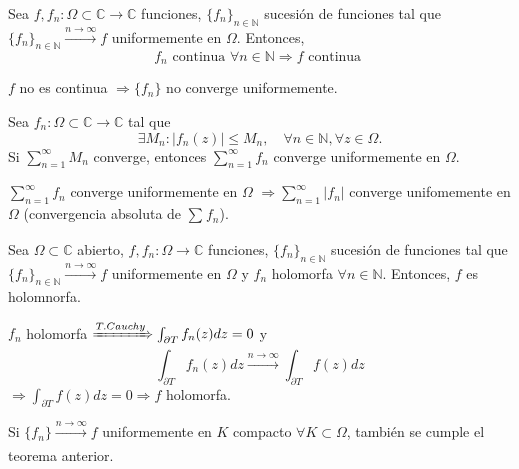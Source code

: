 \begin{prop}
  Sea $f,f_{n}: \Omega \subset \mathbb{C} \to \mathbb{C}$ funciones, $\{ f_{n} \}_{n \in \mathbb{N}}$ sucesión de funciones tal que $\{ f_{n} \}_{n \in \mathbb{N}} \xrightarrow[]{ n \rightarrow \infty } f$ uniformemente en $\Omega$. Entonces,
  \[ 
    f_{n} \text{ continua } \forall n \in \mathbb{N} \Rightarrow f \text{ continua }
  \] 
\end{prop}

\begin{obs}
  $f$ no es continua $\Rightarrow \{ f_{n} \}$ no converge uniformemente.
\end{obs}

\begin{theo}[Weierstrass]
  Sea $f_{n}: \Omega \subset \mathbb{C} \to \mathbb{C}$ tal que
  \[
    \exists M_{n} : | f_{n}(z) | \leq M_{n}, \quad \forall n \in \mathbb{N}, \forall z \in \Omega.
  \]
  Si $\sum_{n = 1}^{\infty} M_{n}$ converge, entonces $\sum_{n = 1}^{\infty} f_{n}$ converge uniformemente en $ \Omega$.
\end{theo}

\begin{obs}
  $\sum_{n = 1}^{\infty} f_{n}$ converge uniformemente en $ \Omega$ $\Rightarrow \sum_{n = 1}^{\infty} | f_{n} |$ converge unifomemente en $\Omega$ (convergencia absoluta de $\sum_{}^{} f_{n}$).
\end{obs}

\begin{theo}
  Sea $\Omega \subset \mathbb{C}$ abierto, $f,f_{n}: \Omega \to \mathbb{C}$ funciones, $\{ f_{n} \}_{n \in \mathbb{N}}$ sucesión de funciones tal que $\{ f_{n} \}_{n \in \mathbb{N}} \xrightarrow[]{ n \rightarrow \infty } f$ uniformemente en $\Omega$ y $f_{n}$ holomorfa $\forall n \in \mathbb{N}$. Entonces, $f$ es holomnorfa.
\end{theo}

\begin{dem}
  $f_{n}$ holomorfa $\xRightarrow[]{ T. Cauchy } \int_{\partial{T}}^{} f_{n}(z) dz = 0$ y
  \[ 
    \int_{\partial{T}}^{} f_{n}(z) dz \xrightarrow[]{ n \rightarrow \infty } \int_{\partial{T}}^{} f(z) dz 
  \] 
  $\Rightarrow \int_{\partial{T}}^{} f(z) dz = 0 \Rightarrow f$ holomorfa.
\end{dem}

\begin{cor}
  Si $\{ f_{n} \} \xrightarrow[]{ n \rightarrow \infty } f$ uniformemente en $K$ compacto $\forall K \subset \Omega$, también se cumple el teorema anterior.
\end{cor}
